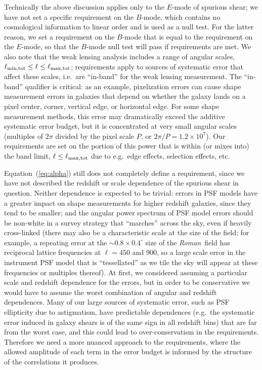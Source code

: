 \documentclass[usenatbib]{mnras}
\newcommand{\wfirst}{{\slshape Roman}}
\begin{document}
Technically the above discussion applies only to the $E$-mode of
spurious shear; we have not set a specific requirement on the
$B$-mode, which contains no cosmological information to linear order
and is used as a null test. For the latter reason, we set a
requirement on the $B$-mode that is equal to the requirement on the
$E$-mode, so that the $B$-mode null test will pass if requirements are
met. We also note that the weak lensing analysis includes a range of angular
scales, $\ell_{\rm min,tot}\le \ell \le \ell_{\rm max,tot}$;
requirements apply to sources of systematic error that affect these
scales, i.e.\ are ``in-band'' for the weak lensing measurement. The ``in-band''
qualifier is critical: as an example, pixelization errors can cause
shape measurement errors in galaxies that depend on whether the galaxy
lands on a pixel center, corner, vertical edge, or horizontal
edge. For some shape measurement methods, this error may dramatically
exceed the additive systematic error budget, but it is concentrated at
very small angular scales (multiples of $2\pi$ divided by the pixel
scale $P$, or $2\pi/P = 1.2\times 10^7$). Our requirements are set on
the portion of this power that is within (or mixes into) the band
limit, $\ell\le\ell_{\rm max,tot}$ due to e.g.\ edge effects,
selection effects, etc.

Equation~(\ref{eq:alpha}) still does not completely define a
requirement, since we have not described the redshift or scale
dependence of the spurious shear in question. Neither dependence is
expected to be trivial: errors in PSF models have a greater impact on
shape measurements for higher redshift galaxies, since they tend to be
smaller; and the angular power spectrum of PSF model errors should be
non-white in a survey strategy that ``marches'' across the sky, even
if heavily cross-linked (there may also be a characteristic scale at
the size of the field; for example, a repeating error at the $\sim
0.8\times0.4^\circ$ size of the \wfirst\ field has reciprocal lattice
frequencies at $\ell = 450$ and 900, so a large scale error in the
instrument PSF model that is ``tessellated'' as we tile the sky will
appear at these frequencies or multiples thereof). At first, we
considered assuming a particular scale and redshift dependence for the
errors, but in order to be conservative we would have to assume the
worst combination of angular and redshift dependences. Many of our
large sources of systematic error, such as PSF ellipticity due to
astigmatism, have predictable dependences (e.g.\ the systematic error
induced in galaxy shears is of the same sign in all redshift bins)
that are far from the worst case, and this could lead to
over-conservatism in the requirements. Therefore we need a more
nuanced approach to the requirements, where the allowed amplitude of
each term in the error budget is informed by the structure of the
correlations it produces.
\end{document}
